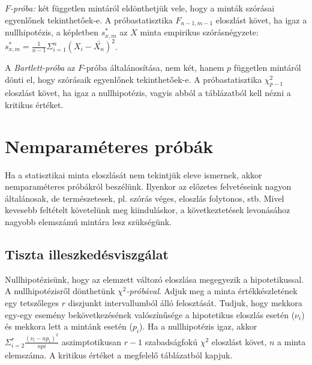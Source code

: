 \emph{$F$-próba:} két független mintáról eldönthetjük vele, hogy a minták szórásai egyenlőnek tekinthetőek-e. A próbastatisztika $F_{n-1,m-1}$ eloszlást követ, ha igaz a nullhipotézis, a képletben $s^*_{x,m}$ az $X$ minta empirikus szórásnégyzete:  $s^*_{x,m} = \frac{1}{n-1} \Sigma_{i=1}^n(X_i - \bar{X_n})^2$.

A \emph{Bartlett-próba} az $F$-próba általánosítása, nem két, hanem $p$ független mintáról dönti el, hogy szórásaik egyenlőnek tekinthetőek-e. A próbastatisztika $\chi^2_{p-1}$ eloszlást követ, ha igaz a nullhipotézis, vagyis abból a táblázatból kell nézni a kritikus értéket.

\section{Nemparaméteres próbák}

Ha a statisztikai minta eloszlását nem tekintjük eleve ismernek, akkor nemparaméteres próbákról beszélünk. Ilyenkor az előzetes felvetéseink nagyon általánosak, de természetesek, pl. szórás véges, eloszlás folytonos, stb. Mivel kevesebb feltételt követelünk meg kiinduláskor, a következtetések levonásához nagyobb elemszámú mintára lesz szükségünk.

\subsection{Tiszta illeszkedésviszgálat}

Nullhipotézisünk, hogy az elemzett változó eloszlása megegyezik a hipotetikussal. A nullhipotézisről dönthetünk \emph{$\chi^2$-próbával}. Adjuk meg a minta értékkészletének egy tetszőleges $r$ diszjunkt intervallumból álló felosztását. Tudjuk, hogy mekkora egy-egy esemény bekövetkezésének valószínűsége a hipotetikus eloszlás esetén ($\nu_i$) és mekkora lett a mintánk esetén ($p_i$). Ha a nullhipotézis igaz, akkor $\Sigma^r_{i=2} \frac{(\nu_i - np_i)^2}{npi}$ aszimptotikusan $r-1$ szabadságfokú $\chi^2$ eloszlást követ, $n$ a minta elemszáma. A kritikus értéket a megfelelő táblázatból kapjuk.